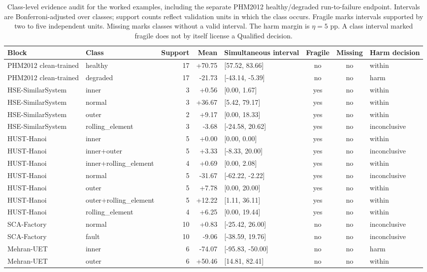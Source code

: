\begin{table}[t]
\centering
\caption{Class-level evidence audit for the worked examples, including the
separate PHM2012 healthy/degraded run-to-failure endpoint. Intervals are
Bonferroni-adjusted over classes; support counts reflect validation units in
which the class occurs. Fragile marks intervals supported by two to five
independent units. Missing marks classes without a valid interval. The harm
margin is $\eta=5$ pp. A class interval marked fragile does not by itself
license a Qualified decision.}
\label{tab:qualification-class-audit}
\scriptsize
\setlength{\tabcolsep}{3pt}
\begin{tabular}{@{}llrrl c c l@{}}
\toprule
Block & Class & Support & Mean & Simultaneous interval & Fragile & Missing & Harm decision \\
\midrule
PHM2012 clean-trained & healthy & 17 & +70.75 & [57.52, 83.66] & no & no & within \\
PHM2012 clean-trained & degraded & 17 & -21.73 & [-43.14, -5.39] & no & no & harm \\
HSE-SimilarSystem & inner & 3 & +0.56 & [0.00, 1.67] & yes & no & within \\
HSE-SimilarSystem & normal & 3 & +36.67 & [5.42, 79.17] & yes & no & within \\
HSE-SimilarSystem & outer & 2 & +9.17 & [0.00, 18.33] & yes & no & within \\
HSE-SimilarSystem & rolling\_element & 3 & -3.68 & [-24.58, 20.62] & yes & no & inconclusive \\
HUST-Hanoi & inner & 5 & +0.00 & [0.00, 0.00] & yes & no & within \\
HUST-Hanoi & inner+outer & 5 & +3.33 & [-8.33, 20.00] & yes & no & inconclusive \\
HUST-Hanoi & inner+rolling\_element & 4 & +0.69 & [0.00, 2.08] & yes & no & within \\
HUST-Hanoi & normal & 5 & -31.67 & [-62.22, -2.22] & yes & no & inconclusive \\
HUST-Hanoi & outer & 5 & +7.78 & [0.00, 20.00] & yes & no & within \\
HUST-Hanoi & outer+rolling\_element & 5 & +12.22 & [1.11, 36.11] & yes & no & within \\
HUST-Hanoi & rolling\_element & 4 & +6.25 & [0.00, 19.44] & yes & no & within \\
SCA-Factory & normal & 10 & +0.83 & [-25.42, 26.00] & no & no & inconclusive \\
SCA-Factory & fault & 10 & -9.06 & [-38.59, 19.76] & no & no & inconclusive \\
Mehran-UET & inner & 6 & -74.07 & [-95.83, -50.00] & no & no & harm \\
Mehran-UET & outer & 6 & +50.46 & [14.81, 82.41] & no & no & within \\
\bottomrule
\end{tabular}
\end{table}
